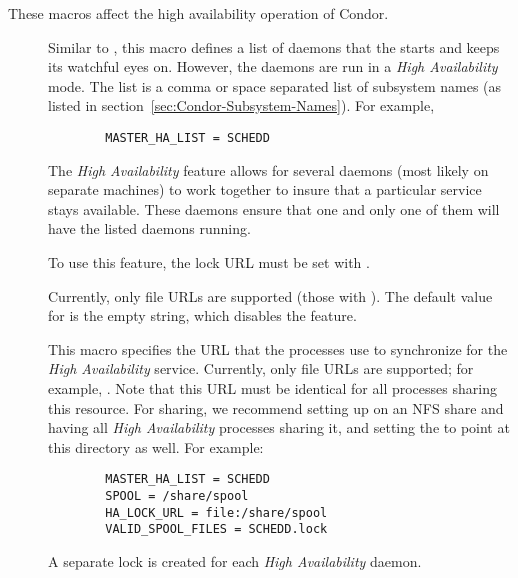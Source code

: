 These macros affect the high availability operation of Condor.

\begin{description}
\item[] \label{param:MasterHAList} Similar to
  , this macro defines a list of daemons that
  the  starts and keeps its watchful eyes on.
  However, the  daemons are run in a
  \emph{High Availability} mode.
  The list is a comma or space separated list of subsystem names
  (as listed in section~\ref{sec:Condor-Subsystem-Names}).
  For example,
  \begin{verbatim}
        MASTER_HA_LIST = SCHEDD
  \end{verbatim}

  The \emph{High Availability} feature allows for several 
  daemons (most likely on separate machines) to work together to
  insure that a particular service stays available.  These
   daemons ensure that one and only one of them will
  have the listed daemons running.

  To use this feature, the lock URL must be set with
  .

  Currently, only file URLs are supported 
  (those with ).
  The default value for  is 
  the empty string, which disables the feature.
  
\item[] \label{param:HALockURL} This macro
  specifies the URL that the  processes use to
  synchronize for the \emph{High Availability} service.
  Currently, only file URLs are supported; for example,
  .  Note that this URL must be identical
  for all  processes sharing this resource.  For
   sharing, we recommend setting up 
  on an NFS share and having all \emph{High Availability}
   processes sharing it,
  and setting the  to point at this directory
  as well.  For example:
\begin{verbatim}
        MASTER_HA_LIST = SCHEDD
        SPOOL = /share/spool
        HA_LOCK_URL = file:/share/spool
        VALID_SPOOL_FILES = SCHEDD.lock
\end{verbatim}

  A separate lock is created for each \emph{High Availability} daemon.


\end{description}
